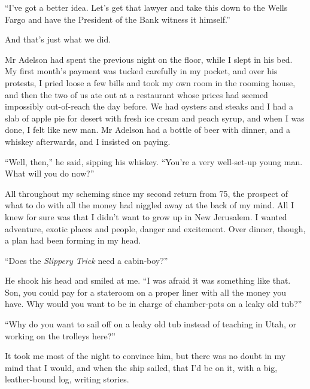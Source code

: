 ``I've got a better idea. Let's get that lawyer and take this down to the Wells 
Fargo and have the President of the Bank witness it himself.''

And that's just what we did.

\tb

Mr Adelson had spent the previous night on the floor, while I slept
in his bed. My first month's payment was tucked carefully in my
pocket, and over his protests, I pried loose a few bills and took
my own room in the rooming house, and then the two of us ate out at
a restaurant whose prices had seemed impossibly out-of-reach the
day before. We had oysters and steaks and I had a slab of apple pie
for desert with fresh ice cream and peach syrup, and when I was
done, I felt like new man. Mr Adelson had a bottle of beer with
dinner, and a whiskey afterwards, and I insisted on paying.

``Well, then,'' he said, sipping his whiskey.
``You're a very well-set-up young man. What will you do now?''

All throughout my scheming since my second return from 75, the
prospect of what to do with all the money had niggled away at the
back of my mind. All I knew for sure was that I didn't want to grow
up in New Jerusalem. I wanted adventure, exotic places and people,
danger and excitement. Over dinner, though, a plan had been forming
in my head.

``Does the \emph{Slippery Trick} need a cabin-boy?''

He shook his head and smiled at me.
``I was afraid it was something like that. Son, you could pay for a stateroom 
on a proper liner with all the money you have. Why would you want to be in 
charge of chamber-pots on a leaky old tub?''

``Why do you want to sail off on a leaky old tub instead of teaching in Utah, 
or working on the trolleys here?''

It took me most of the night to convince him, but there was no
doubt in my mind that I would, and when the ship sailed, that I'd
be on it, with a big, leather-bound log, writing stories.


